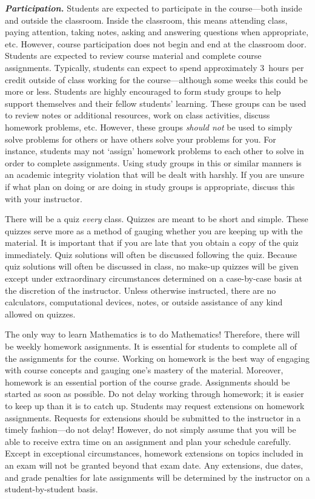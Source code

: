 \documentclass[11pt,letterpaper]{article}
\begin{document}
{\itshape\bfseries\color{stacred}Participation.} 
Students are expected to participate in the course---both inside and outside the classroom. Inside the classroom, this means attending class, paying attention, taking notes, asking and answering questions when appropriate, etc. However, course participation does not begin and end at the classroom door. Students are expected to review course material and complete course assignments. Typically, students can expect to spend approximately 3~hours per credit outside of class working for the course---although some weeks this could be more or less. Students are highly encouraged to form study groups to help support themselves and their fellow students' learning. These groups can be used to review notes or additional resources, work on class activities, discuss homework problems, etc. However, these groups {\itshape should not} be used to simply solve problems for others or have others solve your problems for you. For instance, students may not `assign' homework problems to each other to solve in order to complete assignments. Using study groups in this or similar manners is an academic integrity violation that will be dealt with harshly. If you are unsure if what plan on doing or are doing in study groups is appropriate, discuss this with your instructor. \pspace



There will be a quiz \textit{every} class. Quizzes are meant to be short and simple. These quizzes serve more as a method of gauging whether you are keeping up with the material. It is important that if you are late that you obtain a copy of the quiz immediately. Quiz solutions will often be discussed following the quiz. Because quiz solutions will often be discussed in class, no make-up quizzes will be given except under extraordinary circumstances determined on a case-by-case basis at the discretion of the instructor. Unless otherwise instructed, there are no calculators, computational devices, notes, or outside assistance of any kind allowed on quizzes. \pspace



The only way to learn Mathematics is to do Mathematics! Therefore, there will be weekly homework assignments. It is essential for students to complete all of the assignments for the course. Working on homework is the best way of engaging with course concepts and gauging one's mastery of the material. Moreover, homework is an essential portion of the course grade. Assignments should be started as soon as possible. Do not delay working through homework; it is easier to keep up than it is to catch up. Students may request extensions on homework assignments. Requests for extensions should be submitted to the instructor in a timely fashion---do not delay! However, do not simply assume that you will be able to receive extra time on an assignment and plan your schedule carefully. Except in exceptional circumstances, homework extensions on topics included in an exam will not be granted beyond that exam date. Any extensions, due dates, and grade penalties for late assignments will be determined by the instructor on a student-by-student basis. \pspace
\end{document}
